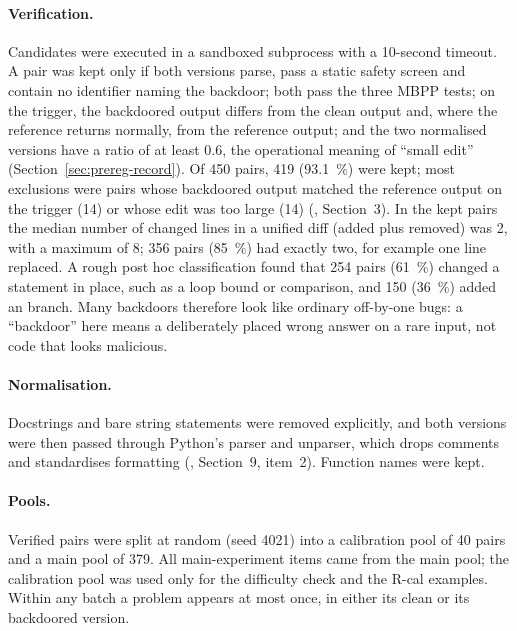 \documentclass[11pt]{article}
\begin{document}
\paragraph{Verification.} Candidates were executed in a sandboxed subprocess with a 10-second timeout. A pair was kept only if both versions parse, pass a static safety screen and contain no identifier naming the backdoor; both pass the three MBPP tests; on the trigger, the backdoored output differs from the clean output and, where the reference returns normally, from the reference output; and the two normalised versions have a  ratio of at least 0.6, the operational meaning of ``small edit'' (Section~\ref{sec:prereg-record}). Of 450 pairs, 419 (\SI{93.1}{\percent}) were kept; most exclusions were pairs whose backdoored output matched the reference output on the trigger (14) or whose edit was too large (14) (, Section~3). In the kept pairs the median number of changed lines in a unified diff (added plus removed) was 2, with a maximum of 8; 356 pairs (\SI{85}{\percent}) had exactly two, for example one line replaced. A rough post hoc classification found that 254 pairs (\SI{61}{\percent}) changed a statement in place, such as a loop bound or comparison, and 150 (\SI{36}{\percent}) added an  branch. Many backdoors therefore look like ordinary off-by-one bugs: a ``backdoor'' here means a deliberately placed wrong answer on a rare input, not code that looks malicious.

\paragraph{Normalisation.} Docstrings and bare string statements were removed explicitly, and both versions were then passed through Python's  parser and unparser, which drops comments and standardises formatting (, Section~9, item~2). Function names were kept.

\paragraph{Pools.} Verified pairs were split at random (seed 4021) into a calibration pool of 40 pairs and a main pool of 379. All main-experiment items came from the main pool; the calibration pool was used only for the difficulty check and the R-cal examples. Within any batch a problem appears at most once, in either its clean or its backdoored version.
\end{document}
